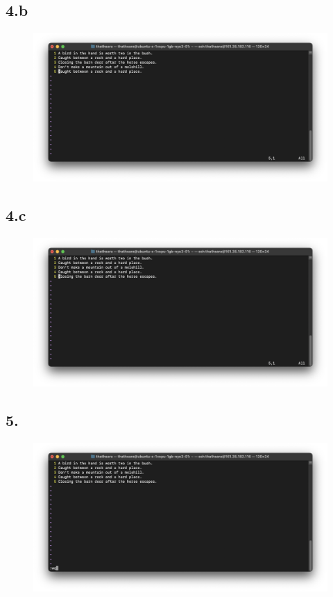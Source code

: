 \documentclass{article}
\begin{document}
    \subsection*{4.b}
    \begin{figure}[H]
        \centering
        \includegraphics[width=\textwidth]{1/4_b.png}
    \end{figure}

    \subsection*{4.c}
    \begin{figure}[H]
        \centering
        \includegraphics[width=\textwidth]{1/4_c.png}
    \end{figure}

    \subsection*{5.}
    \begin{figure}[H]
        \centering
        \includegraphics[width=\textwidth]{1/5.png}
    \end{figure}
\end{document}
